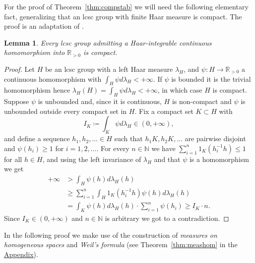 \documentclass{amsart}
\numberwithin{equation}{subsection}
\newtheorem{lem}[thm]{Lemma}
\begin{document}
For the proof of Theorem~\ref{thm:compstab} we will need the following elementary fact, generalizing that an lcsc group with finite Haar measure is compact. The proof is an adaptation of \cite[Chapter II, \S5, Proposition 4]{nachbin1965haar}.

\begin{lem}
\label{lem:compcriter}
Every lcsc group admitting a Haar-integrable continuous homomorphism into \(\mathbb{R}_{>0}\) is compact.
\end{lem}

\begin{proof}
Let \(H\) be an lcsc group with a left Haar measure \(\lambda_{H}\), and \(\psi:H\to\mathbb{R}_{>0}\) a continuous homomorphism with \(\int_{H}\psi d\lambda_{H}<+\infty\). If \(\psi\) is bounded it is the trivial homomorphism hence \(\lambda_{H}\left(H\right)=\int_{H}\psi d\lambda_{H}<+\infty\),
in which case \(H\) is compact. Suppose \(\psi\) is unbounded and, since it is continuous, \(H\) is non-compact and \(\psi\) is unbounded outside every compact set in \(H\). Fix a compact set \(K\subset H\) with
\[I_{K}\coloneqq \int_{K}\psi d\lambda_{H}\in\left(0,+\infty\right),\]
and define a sequence \(h_{1},h_{2},\dotsc\in H\) such that \(h_{1}K,h_{2}K,\dotsc\) are pairwise disjoint and \(\psi\left(h_{i}\right)\geq 1\) for \(i=1,2,\dotsc\). For every \(n\in\mathbb{N}\) we have \(\sum\nolimits_{i=1}^{n}1_{K}\left(h_{i}^{-1}h\right)\leq1\) for all \(h\in H\), and using the left invariance of \(\lambda_{H}\) and that \(\psi\) is a homomorphism we get
\begin{align*}
+\infty
&>\int_{H}\psi\left(h\right)d\lambda_{H}\left(h\right)\\
&\geq\sum\nolimits_{i=1}^{n}\int_{H}1_{K}\left(h_{i}^{-1}h\right)\psi\left(h\right)d\lambda_{H}\left(h\right)\\
&=\int_{K}\psi\left(h\right)d\lambda_{H}\left(h\right)\cdot\sum\nolimits_{i=1}^{n}\psi\left(h_{i}\right)\geq I_{K}\cdot n.
\end{align*}
Since \(I_{K}\in\left(0,+\infty\right)\) and \(n\in\mathbb{N}\) is arbitrary we got to a contradiction.
\end{proof}

In the following proof we make use of the construction of \emph{measures on homogeneous spaces} and \emph{Weil's formula} (see Theorem~\ref{thm:meashom} in the \hyperref[Appendix: Measures on Homogeneous Spaces]{Appendix}).
\end{document}
